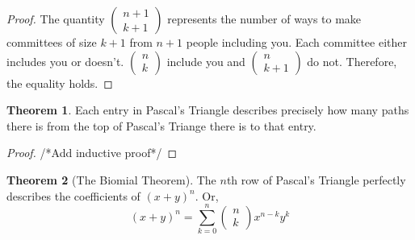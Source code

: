 \documentclass[11pt]{article}
\theoremstyle{definition}
\newtheorem{theorem}{Theorem}[section]
\begin{document}
\begin{proof}
    The quantity $(\begin{smallmatrix} n+1 \\ k+1 \end{smallmatrix})$ represents the number of ways to make committees of size $k+1$ from $n+1$ people including you. Each committee either includes you or doesn't. $(\begin{smallmatrix} n \\ k \end{smallmatrix})$ include you and $(\begin{smallmatrix} n \\ k+1 \end{smallmatrix})$ do not. Therefore, the equality holds.
\end{proof}
\begin{theorem}
Each entry in Pascal's Triangle describes precisely how many paths there is from the top of Pascal's Triange there is to that entry.
\end{theorem}
\begin{proof}
/*Add inductive proof*/
\end{proof}
\begin{theorem}[The Biomial Theorem]
    The $n$th row of Pascal's Triangle perfectly describes the coefficients of $(x+y)^n$. Or, 
    \begin{equation*}
        (x+y)^n = \sum_{k=0}^n
        \begin{pmatrix} n \\ k \end{pmatrix}x^{n-k}y^k
    \end{equation*}
\end{theorem}
\end{document}
